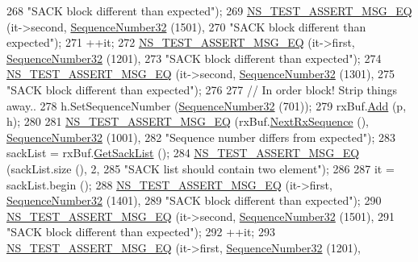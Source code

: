 \begin{DoxyCode}
268                          \textcolor{stringliteral}{"SACK block different than expected"});
269   \hyperlink{group__testing_ga2a9d78cffb3db8e867c35fff0b698cf5}{NS\_TEST\_ASSERT\_MSG\_EQ} (it->second, \hyperlink{classns3_1_1SequenceNumber}{SequenceNumber32} (1501),
270                          \textcolor{stringliteral}{"SACK block different than expected"});
271   ++it;
272   \hyperlink{group__testing_ga2a9d78cffb3db8e867c35fff0b698cf5}{NS\_TEST\_ASSERT\_MSG\_EQ} (it->first, \hyperlink{classns3_1_1SequenceNumber}{SequenceNumber32} (1201),
273                          \textcolor{stringliteral}{"SACK block different than expected"});
274   \hyperlink{group__testing_ga2a9d78cffb3db8e867c35fff0b698cf5}{NS\_TEST\_ASSERT\_MSG\_EQ} (it->second, \hyperlink{classns3_1_1SequenceNumber}{SequenceNumber32} (1301),
275                          \textcolor{stringliteral}{"SACK block different than expected"});
276 
277   \textcolor{comment}{// In order block! Strip things away..}
278   h.SetSequenceNumber (\hyperlink{classns3_1_1SequenceNumber}{SequenceNumber32} (701));
279   rxBuf.\hyperlink{classns3_1_1TcpRxBuffer_a35a036383b8976cb79738c28aa01d5d0}{Add} (p, h);
280 
281   \hyperlink{group__testing_ga2a9d78cffb3db8e867c35fff0b698cf5}{NS\_TEST\_ASSERT\_MSG\_EQ} (rxBuf.\hyperlink{classns3_1_1TcpRxBuffer_ae994bf90329d10f17b59d32907b04ca9}{NextRxSequence} (), 
      \hyperlink{group__network_gacb2070e4e98d2d5135c9bede58f07a03}{SequenceNumber32} (1001),
282                          \textcolor{stringliteral}{"Sequence number differs from expected"});
283   sackList = rxBuf.\hyperlink{classns3_1_1TcpRxBuffer_afc5d672da4595330754de1bb3933a9c7}{GetSackList} ();
284   \hyperlink{group__testing_ga2a9d78cffb3db8e867c35fff0b698cf5}{NS\_TEST\_ASSERT\_MSG\_EQ} (sackList.size (), 2,
285                          \textcolor{stringliteral}{"SACK list should contain two element"});
286 
287   it = sackList.begin ();
288   \hyperlink{group__testing_ga2a9d78cffb3db8e867c35fff0b698cf5}{NS\_TEST\_ASSERT\_MSG\_EQ} (it->first, \hyperlink{classns3_1_1SequenceNumber}{SequenceNumber32} (1401),
289                          \textcolor{stringliteral}{"SACK block different than expected"});
290   \hyperlink{group__testing_ga2a9d78cffb3db8e867c35fff0b698cf5}{NS\_TEST\_ASSERT\_MSG\_EQ} (it->second, \hyperlink{classns3_1_1SequenceNumber}{SequenceNumber32} (1501),
291                          \textcolor{stringliteral}{"SACK block different than expected"});
292   ++it;
293   \hyperlink{group__testing_ga2a9d78cffb3db8e867c35fff0b698cf5}{NS\_TEST\_ASSERT\_MSG\_EQ} (it->first, \hyperlink{classns3_1_1SequenceNumber}{SequenceNumber32} (1201),

\end{DoxyCode}
